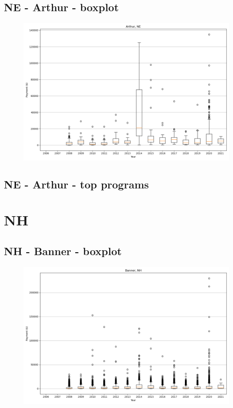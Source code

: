 \subsection*{NE - Arthur - boxplot}
\begin{figure}[h]
\centering
\includegraphics[width=7in]{../output/boxplots/counties/Arthur-NE_boxplot.png}
\end{figure}


\subsection*{NE - Arthur - top programs}

\newpage
\section*{NH}
\subsection*{NH - Banner - boxplot}
\begin{figure}[h]
\centering
\includegraphics[width=7in]{../output/boxplots/counties/Banner-NH_boxplot.png}
\end{figure}


